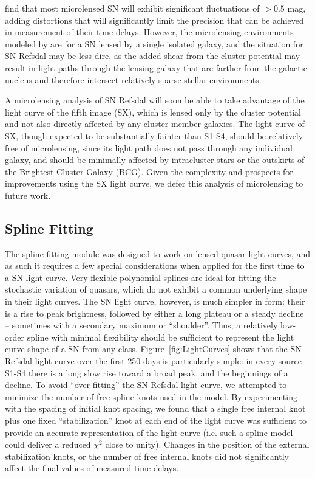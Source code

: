 \citet{Dobler:2006} find that most microlensed SN will exhibit significant fluctuations of $>0.5$ mag, adding distortions that will significantly limit the precision that can be achieved in measurement of their time delays.  However, the microlensing environments modeled by \citep{Dobler:2006} are for a SN lensed by a single isolated galaxy, and the situation for SN Refsdal may be less dire, as the added shear from the  cluster potential may result in light paths through the lensing galaxy that are farther from the galactic nucleus and therefore intersect relatively sparse stellar environments.  

A microlensing analysis of SN Refsdal will soon be able to take advantage of the light curve of the fifth image (SX), which is lensed only by the  cluster potential and not also directly affected by any cluster member galaxies.  The light curve of SX, though expected to be substantially fainter than S1-S4, should be relatively free of microlensing, since its light path does not pass through any individual galaxy, and should be minimally affected by intracluster stars or the outskirts of the  Brightest Cluster Galaxy (BCG).  Given the complexity and prospects for improvements using the SX light curve, we defer this analysis of microlensing to future work.  

\subsection{\pycs Spline Fitting}\label{sec:PycsSplineFitting}

The \pycs spline fitting module was designed to work on lensed quasar light curves, and as such it requires a few special considerations when applied for the first time to a SN light curve.  Very flexible polynomial splines are ideal for fitting the stochastic variation of quasars, which do not exhibit a common underlying shape in their light curves.  The SN light curve, however, is much simpler in form: their is a rise to peak brightness, followed by either a long plateau or a steady decline -- sometimes with a secondary maximum or ``shoulder''.  Thus, a relatively low-order spline with minimal flexibility should be sufficient to represent the light curve shape of a SN from any class.  Figure~\ref{fig:LightCurves} shows that the SN Refsdal light curve over the first 250 days is particularly simple: in every source S1-S4 there is a long slow rise toward a broad peak, and the beginnings of a decline.  To avoid ``over-fitting'' the SN Refsdal light curve, we attempted to minimize the number of free spline knots used in the \pycs model.  By experimenting with the spacing of initial knot spacing, we found that a single free internal knot plus one fixed ``stabilization'' knot at each end of the light curve was sufficient to provide an accurate representation of the light curve (i.e. such a spline model could deliver a reduced $\chi^2$ close to unity).  Changes in the position of the external stabilization knots, or the number of free internal  knots did not significantly affect the final values of measured time delays. 

